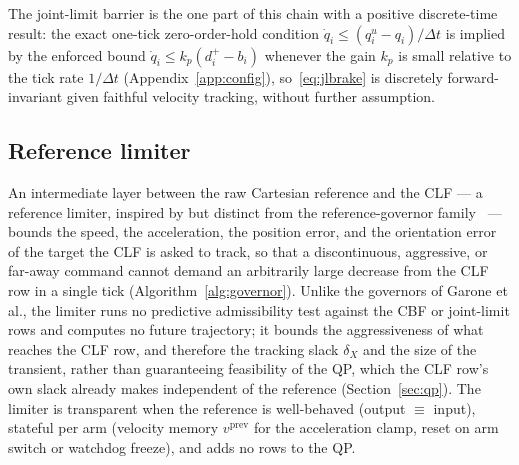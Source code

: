 \documentclass[12pt,a4paper,twoside,openright]{report}
\newcommand{\qdot}{\dot{q}}
\begin{document}
The joint-limit barrier is the one part of this chain with a positive discrete-time result: the exact one-tick zero-order-hold condition $\qdot_i \le (q_i^u - q_i)/\Delta t$ is implied by the enforced bound $\qdot_i \le k_p(d_i^+ - b_i)$ whenever the gain $k_p$ is small relative to the tick rate $1/\Delta t$ (Appendix~\ref{app:config}), so~\eqref{eq:jlbrake} is discretely forward-invariant given faithful velocity tracking, without further assumption.

\subsection{Reference limiter}
\label{sec:governor}

An intermediate layer between the raw Cartesian reference and the CLF --- a reference limiter, inspired by but distinct from the reference-governor family~\cite{garone2017} --- bounds the speed, the acceleration, the position error, and the orientation error of the target the CLF is asked to track, so that a discontinuous, aggressive, or far-away command cannot demand an arbitrarily large decrease from the CLF row in a single tick (Algorithm~\ref{alg:governor}). Unlike the governors of Garone et al., the limiter runs no predictive admissibility test against the CBF or joint-limit rows and computes no future trajectory; it bounds the aggressiveness of what reaches the CLF row, and therefore the tracking slack $\delta_X$ and the size of the transient, rather than guaranteeing feasibility of the QP, which the CLF row's own slack already makes independent of the reference (Section~\ref{sec:qp}). The limiter is transparent when the reference is well-behaved (output $\equiv$ input), stateful per arm (velocity memory $v^{\text{prev}}$ for the acceleration clamp, reset on arm switch or watchdog freeze), and adds no rows to the QP.
\end{document}
